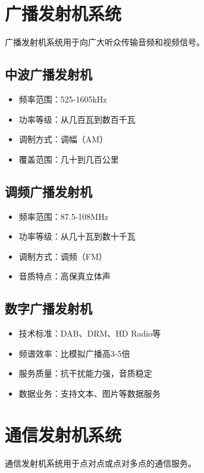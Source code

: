 \documentclass[12pt,UTF8]{ctexbook}
\begin{document}
\section{广播发射机系统}

广播发射机系统用于向广大听众传输音频和视频信号。

\subsection{中波广播发射机}
\begin{itemize}[leftmargin=3.5em]
    \item 频率范围：525-1605kHz
    \item 功率等级：从几百瓦到数百千瓦
    \item 调制方式：调幅（AM）
    \item 覆盖范围：几十到几百公里
\end{itemize}

\subsection{调频广播发射机}
\begin{itemize}[leftmargin=3.5em]
    \item 频率范围：87.5-108MHz
    \item 功率等级：从几十瓦到数十千瓦
    \item 调制方式：调频（FM）
    \item 音质特点：高保真立体声
\end{itemize}

\subsection{数字广播发射机}
\begin{itemize}[leftmargin=3.5em]
    \item 技术标准：DAB、DRM、HD Radio等
    \item 频谱效率：比模拟广播高3-5倍
    \item 服务质量：抗干扰能力强，音质稳定
    \item 数据业务：支持文本、图片等数据服务
\end{itemize}

\section{通信发射机系统}

通信发射机系统用于点对点或点对多点的通信服务。
\end{document}

